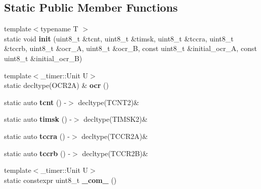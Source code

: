\subsection*{Static Public Member Functions}
\begin{DoxyCompactItemize}
\item 
\hypertarget{struct__timer2_1_1TimerDef_ae62a0aed34d1f08b3762198423643d5d}{}\label{struct__timer2_1_1TimerDef_ae62a0aed34d1f08b3762198423643d5d} 
{\footnotesize template$<$typename T $>$ }\\static void {\bfseries init} (uint8\+\_\+t \&tcnt, uint8\+\_\+t \&timsk, uint8\+\_\+t \&tccra, uint8\+\_\+t \&tccrb, uint8\+\_\+t \&ocr\+\_\+A, uint8\+\_\+t \&ocr\+\_\+B, const uint8\+\_\+t \&initial\+\_\+ocr\+\_\+A, const uint8\+\_\+t \&initial\+\_\+ocr\+\_\+B)
\item 
\hypertarget{struct__timer2_1_1TimerDef_a523743f5df50cbf31d78788a540523c8}{}\label{struct__timer2_1_1TimerDef_a523743f5df50cbf31d78788a540523c8} 
{\footnotesize template$<$\+\_\+timer\+::\+Unit U$>$ }\\static decltype(O\+C\+R2A) \& {\bfseries ocr} ()
\item 
\hypertarget{struct__timer2_1_1TimerDef_a77ffa6627938529350f5d566511f3e9a}{}\label{struct__timer2_1_1TimerDef_a77ffa6627938529350f5d566511f3e9a} 
static auto {\bfseries tcnt} () -\/$>$ decltype(T\+C\+N\+T2)\&
\item 
\hypertarget{struct__timer2_1_1TimerDef_a7112e5b8029941e7bef449e1961031f9}{}\label{struct__timer2_1_1TimerDef_a7112e5b8029941e7bef449e1961031f9} 
static auto {\bfseries timsk} () -\/$>$ decltype(T\+I\+M\+S\+K2)\&
\item 
\hypertarget{struct__timer2_1_1TimerDef_a3e39ad00e0e112a8280ae59df1d14e8f}{}\label{struct__timer2_1_1TimerDef_a3e39ad00e0e112a8280ae59df1d14e8f} 
static auto {\bfseries tccra} () -\/$>$ decltype(T\+C\+C\+R2A)\&
\item 
\hypertarget{struct__timer2_1_1TimerDef_a9239a84a67f6c09ef673735a2b0dbb73}{}\label{struct__timer2_1_1TimerDef_a9239a84a67f6c09ef673735a2b0dbb73} 
static auto {\bfseries tccrb} () -\/$>$ decltype(T\+C\+C\+R2B)\&
\item 
\hypertarget{struct__timer2_1_1TimerDef_a051f747118eef23a55327e261380d707}{}\label{struct__timer2_1_1TimerDef_a051f747118eef23a55327e261380d707} 
{\footnotesize template$<$\+\_\+timer\+::\+Unit U$>$ }\\static constexpr uint8\+\_\+t {\bfseries \+\_\+com\+\_} ()
\item 
\hypertarget{struct__timer2_1_1TimerDef_abbc0de13e62f594ab751822434e2c061}{}\label{struct__timer2_1_1TimerDef_abbc0de13e62f594ab751822434e2c061} 

\end{DoxyCompactItemize}
